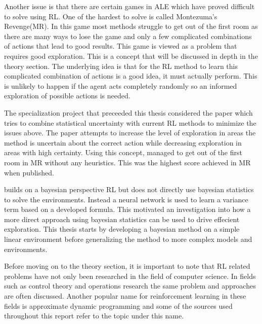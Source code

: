 Another issue is that there are certain games in ALE which have proved difficult to solve using RL. One of the hardest to solve is called Montezuma's Revenge(MR). In this game most methods struggle to get out of the first room as there are many ways to lose the game and only a few complicated combinations of actions that lead to good results. This game is viewed as a problem that requires good exploration. This is a concept that will be discussed in depth in the theory section. The underlying idea is that for the RL method to learn this complicated combination of actions is a good idea, it must actually perform. This is unlikely to happen if the agent acts completely randomly so an informed exploration of possible actions is needed.

The specialization project that preceeded this thesis considered the paper \cite{donoghue_2017} which tries to combine statistical uncertainty with current RL methods to minimize the issues above. The paper attempts to increase the level of exploration in areas the method is uncertain about the correct action while decreasing exploration in areas with high certainty. Using this concept, \cite{donoghue_2017} managed to get out of the first room in MR without any heuristics. This was the highest score achieved in MR when published.

\cite{donoghue_2017} builds on a bayesian perspective RL but does not directly use bayesian statistics to solve the environments. Instead a neural network is used to learn a variance term based on a developed formula. This motivated an investigation into how a more direct approach using bayesian statistics can be used to drive effecient exploration. This thesis starts by developing a bayesian method on a simple linear environment before generalizing the method to more complex models and environments.

Before moving on to the theory section, it is important to note that RL related problems have not only been researched in the field of computer science. In fields such as control theory and operations research the same problem and approaches are often discussed. Another popular name for reinforcement learning in these fields is approximate dynamic programming and some of the sources used throughout this report refer to the topic under this name. \citep[p.~16]{powell_2011}

\cleardoublepage